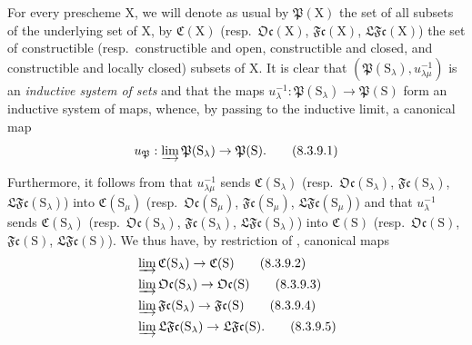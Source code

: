 \begin{env}[8.3.9]
\label{IV.8.3.9}
For every prescheme $\mathrm{X}$, we will denote as usual by $\mathfrak{P}(\mathrm{X})$ the set of all subsets of the underlying set of $\mathrm{X}$, by $\mathfrak{C}(\mathrm{X})$ (resp.\ $\mathfrak{Oc}(\mathrm{X})$, $\mathfrak{Fc}(\mathrm{X})$, $\mathfrak{LFc}(\mathrm{X})$) the set of constructible (resp.\ constructible and open, constructible and closed, and constructible and locally closed) subsets of $\mathrm{X}$.
It is clear that $(\mathfrak{P}(\mathrm{S}_\lambda),u_{\lambda\mu}^{-1})$ is an \emph{inductive system of sets} and that the maps $u_\lambda^{-1}:\mathfrak{P}(\mathrm{S}_\lambda)\to\mathfrak{P}(\mathrm{S})$ form an inductive system of maps, whence, by passing to the inductive limit, a canonical map
\begin{equation}
  u_\mathfrak{P}:\varinjlim\mathfrak{P}(\mathrm{S}_\lambda)\to\mathfrak{P}(\mathrm{S}).
  \tag{8.3.9.1}
\label{IV.8.3.9.1}
\end{equation}

Furthermore, it follows from  that $u_{\lambda\mu}^{-1}$ sends $\mathfrak{C}(\mathrm{S}_\lambda)$ (resp.\ $\mathfrak{Oc}(\mathrm{S}_\lambda)$, $\mathfrak{Fc}(\mathrm{S}_\lambda)$, $\mathfrak{LFc}(\mathrm{S}_\lambda)$) into $\mathfrak{C}(\mathrm{S}_\mu)$ (resp.\ $\mathfrak{Oc}(\mathrm{S}_\mu)$, $\mathfrak{Fc}(\mathrm{S}_\mu)$, $\mathfrak{LFc}(\mathrm{S}_\mu)$) and that $u_\lambda^{-1}$ sends $\mathfrak{C}(\mathrm{S}_\lambda)$ (resp.\ $\mathfrak{Oc}(\mathrm{S}_\lambda)$, $\mathfrak{Fc}(\mathrm{S}_\lambda)$, $\mathfrak{LFc}(\mathrm{S}_\lambda)$) into $\mathfrak{C}(\mathrm{S})$ (resp.\ $\mathfrak{Oc}(\mathrm{S})$, $\mathfrak{Fc}(\mathrm{S})$, $\mathfrak{LFc}(\mathrm{S})$).
We thus have, by restriction of , canonical maps
\begin{align}
  &\varinjlim\mathfrak{C}(\mathrm{S}_\lambda)\to\mathfrak{C}(\mathrm{S}) \tag{8.3.9.2}\label{IV.8.3.9.2}\\
  &\varinjlim\mathfrak{Oc}(\mathrm{S}_\lambda)\to\mathfrak{Oc}(\mathrm{S}) \tag{8.3.9.3}\label{IV.8.3.9.3}\\
  &\varinjlim\mathfrak{Fc}(\mathrm{S}_\lambda)\to\mathfrak{Fc}(\mathrm{S}) \tag{8.3.9.4}\label{IV.8.3.9.4}\\
  &\varinjlim\mathfrak{LFc}(\mathrm{S}_\lambda)\to\mathfrak{LFc}(\mathrm{S}). \tag{8.3.9.5}
\label{IV.8.3.9.5}
\end{align}
\end{env}

